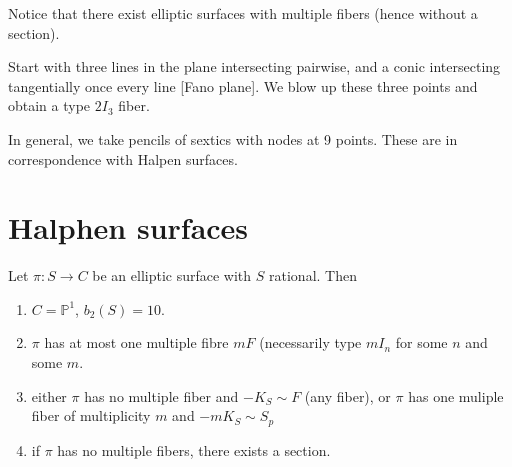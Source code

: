 \noindent
Notice that there exist elliptic surfaces
with multiple fibers
(hence without a section).

\begin{example}
\label{example-multiple-fibers}
Start with three lines in the plane
intersecting pairwise, and a conic
intersecting tangentially
once every line [Fano plane].
We blow up these three points and obtain
a type $2I_3$ fiber.

In general, we take pencils of sextics
with nodes at 9 points. These are in
correspondence
with Halpen surfaces.
\end{example}





\section{Halphen surfaces}
\label{section-halphen-surfaces}


\begin{proposition}
\label{proposition-res}
Let $\pi:S \to C$ be an elliptic surface with
$S$ rational.
Then
\begin{enumerate}
\item $C=\mathbb{P}^1$, $b_2(S)=10$.

\item $\pi$ has at most one multiple fibre
$mF$
(necessarily type  $m I_n$
for some $n$ and some $m$.

\item either $\pi$ has no multiple fiber
and $-K_S \sim F$ (any fiber),
or $\pi$ has one muliple fiber
of multiplicity $m$ and $-m K_S \sim S_p$

\item if $\pi$ has no multiple fibers, there
exists a section.
\end{enumerate}
\end{proposition}

